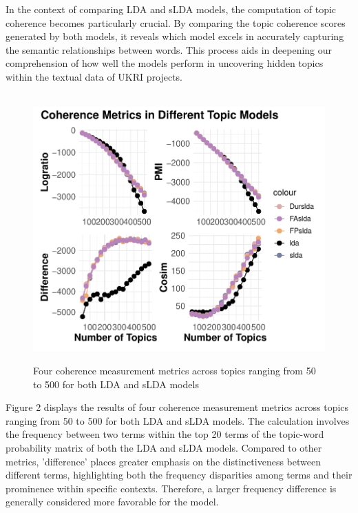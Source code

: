 \documentclass[12pt,twoside]{article}
\begin{document}
In the context of comparing LDA and sLDA models, the computation of topic coherence becomes particularly crucial. By comparing the topic coherence scores generated by both models, it reveals which model excels in accurately capturing the semantic relationships between words. This process aids in deepening our comprehension of how well the models perform in uncovering hidden topics within the textual data of UKRI projects.\\\\


\begin{figure}[h]
    \centering
    \includegraphics[width=15cm]{./figures/Coherence}\\[0.2cm] 
    \caption{Four coherence measurement metrics across topics ranging from 50 to 500 for both LDA and sLDA models}

\end{figure}

Figure 2 displays the results of four coherence measurement metrics across topics ranging from 50 to 500 for both LDA and sLDA models. The calculation involves the frequency between two terms within the top 20 terms of the topic-word probability matrix of both the LDA and sLDA models. Compared to other metrics, 'difference' places greater emphasis on the distinctiveness between different terms, highlighting both the frequency disparities among terms and their prominence within specific contexts. Therefore, a larger frequency difference is generally considered more favorable for the model.\\\\
\end{document}
